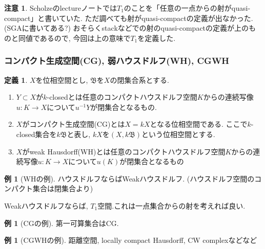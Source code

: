 \documentclass[dvipdfmx,a4paper,11pt]{report}
\theoremstyle{definition}
\newtheorem{dfn}[thm]{定義}
\newtheorem{rem}[thm]{注意}
\newtheorem{exa}[thm]{例}
\begin{document}
 \begin{rem}
 Scholzeのlectureノート\cite{Sch19}では$T_1$のことを「任意の一点からの射がquasi-compact」と書いていた.
 ただ調べても射がquasi-compactの定義が出なかった. (SGAに書いてある?)
 おそらくstackなどでの射のquasi-compactの定義が上のものと同値であるので, 今回は上の意味で$T_1$を定義した. 
 
 \end{rem}

\subsubsection{コンパクト生成空間(CG), 弱ハウスドルフ(WH), CGWH}


\begin{tcolorbox}
 [colback = white, colframe = green!35!black, fonttitle = \bfseries,breakable = true]
\begin{dfn}\cite[Definition 1.1 ,1.2]{Str}
$X$を位相空間とし, $\mathfrak{B}$を$X$の閉集合系とする. 
\begin{enumerate}
\item $Y \subset X$が$k$-closedとは任意のコンパクトハウスドルフ空間$K$からの連続写像$u : K \to X$について$u^{-1}Y$が閉集合となるもの. 
\item $X$がコンパクト生成空間(CG)とは$X = kX$となる位相空間である. ここで$k$-closed集合を$k\mathfrak{B}$と表し, $kX$を$(X, k\mathfrak{B})$という位相空間とする. 
\item $X$がweak Hausdorff(WH)とは任意のコンパクトハウスドルフ空間$K$からの連続写像$u : K \to X$について$u(K)$が閉集合となるもの
\end{enumerate}
\end{dfn}
\end{tcolorbox}

\begin{exa}[WHの例]
ハウスドルフならばWeakハウスドルフ. (ハウスドルフ空間のコンパクト集合は閉集合より)

Weakハウスドルフならば, $T_1$空間.これは一点集合からの射を考えれば良い.
\end{exa}

\begin{exa}[CGの例]
第一可算集合はCG. 
\end{exa}

\begin{exa}[CGWHの例]
距離空間, locally compact Hausdorff, CW complexなどなど
\end{exa}
\end{document}
